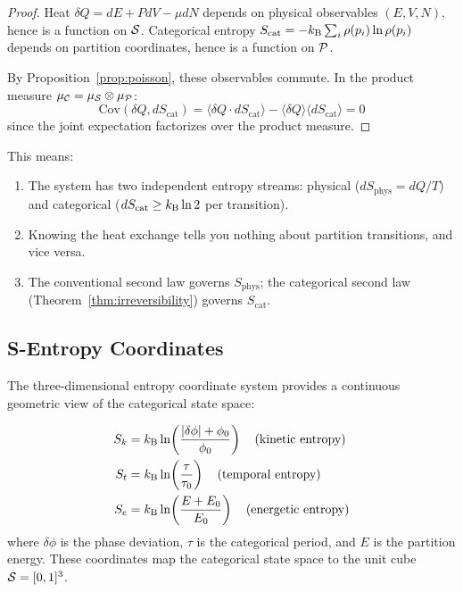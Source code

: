 \begin{proof}
Heat $\delta Q = dE + PdV - \mu dN$ depends on physical observables $(E, V, N)$, hence is a function on $\mathcal{S}$. Categorical entropy $S_{\mathrm{cat}} = -k_{\mathrm{B}} \sum_i \rho(p_i) \ln \rho(p_i)$ depends on partition coordinates, hence is a function on $\mathcal{P}$.

By Proposition~\ref{prop:poisson}, these observables commute. In the product measure $\mu_{\mathcal{C}} = \mu_{\mathcal{S}} \otimes \mu_{\mathcal{P}}$:
\begin{equation}
    \mathrm{Cov}(\delta Q, dS_{\mathrm{cat}}) = \langle \delta Q \cdot dS_{\mathrm{cat}} \rangle - \langle \delta Q\rangle\langle dS_{\mathrm{cat}}\rangle = 0
\end{equation}
since the joint expectation factorizes over the product measure.
\end{proof}

\begin{remark}[Consequences]
This means:
\begin{enumerate}
    \item The system has two independent entropy streams: physical ($dS_{\mathrm{phys}} = dQ/T$) and categorical ($dS_{\mathrm{cat}} \geq k_{\mathrm{B}} \ln 2$ per transition).
    \item Knowing the heat exchange tells you nothing about partition transitions, and vice versa.
    \item The conventional second law governs $S_{\mathrm{phys}}$; the categorical second law (Theorem~\ref{thm:irreversibility}) governs $S_{\mathrm{cat}}$.
\end{enumerate}
\end{remark}

\subsection{S-Entropy Coordinates}

The three-dimensional entropy coordinate system provides a continuous geometric view of the categorical state space:

\begin{definition}
\label{def:s_coords}
\begin{align}
    S_k &= k_{\mathrm{B}} \ln\!\left(\frac{|\delta\phi| + \phi_0}{\phi_0}\right) \quad \text{(kinetic entropy)} \\
    S_t &= k_{\mathrm{B}} \ln\!\left(\frac{\tau}{\tau_0}\right) \quad \text{(temporal entropy)} \\
    S_e &= k_{\mathrm{B}} \ln\!\left(\frac{E + E_0}{E_0}\right) \quad \text{(energetic entropy)}
\end{align}
where $\delta\phi$ is the phase deviation, $\tau$ is the categorical period, and $E$ is the partition energy. These coordinates map the categorical state space to the unit cube $\mathcal{S} = [0,1]^3$.
\end{definition}

